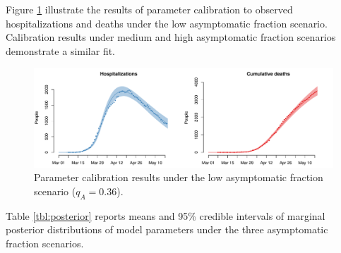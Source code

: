 \documentclass[11pt]{article}
\begin{document}
Figure \ref{fig:fit} illustrate the results of parameter calibration to observed hospitalizations and deaths under the low asymptomatic fraction scenario. 
Calibration results under medium and high asymptomatic fraction scenarios demonstrate a similar fit.

\begin{figure}[htb]
	\centering
	\includegraphics[width=.8\textwidth]{figures/calibration.pdf}
	\caption{Parameter calibration results under the low asymptomatic fraction scenario ($q_A = 0.36$).}
	\label{fig:fit}
\end{figure}


Table \ref{tbl:posterior} reports means and 95\% credible intervals of marginal posterior distributions of model parameters under the three asymptomatic fraction scenarios.
\end{document}
